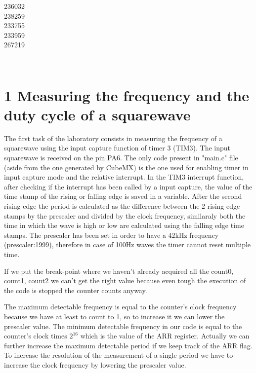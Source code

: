 \documentclass[12pt]{article}
\begin{document}
\begin{titlepage}
\begin{minipage}{0.4\textwidth}
			\begin{flushright} \large
			236032\\													%
			238259\\
            233755\\
            233959\\
            267219\\
            
		\end{flushright}
        
	\end{minipage}\\[2 cm]
	
\end{titlepage}

\newpage

\section*{1 Measuring the frequency and the duty cycle of a squarewave }

The first task of the laboratory consists in measuring the frequency of a squarewave using the input capture function of timer 3 (TIM3). The input squarewave is received on the pin PA6.
The only code present in "main.c" file (aside from the one generated by CubeMX) is the one used for enabling timer in input capture mode and the relative interrupt.
In the TIM3 interrupt function, after checking if the interrupt has been called by a input capture, the value of the time stamp of the rising or falling edge is saved in a variable. After the second rising edge the period is calculated as the difference between the 2 rising edge stamps by the prescaler and divided by the clock frequency, similaraly both the time in which the wave is high or low are calculated using the falling edge time stamps.
The prescaler has been set in order to have a 42kHz frequency (prescaler:1999), therefore in case of 100Hz waves the timer cannot reset multiple time.

If we put the break-point where we haven't already acquired all the count0, count1, count2 we can't get the right value because even tough the execution of the code is stopped the counter counts anyway.

The maximum detectable frequency is equal to the counter's clock frequency because we have at least to count to 1, so to increase it we can lower the prescaler value. The minimum detectable frequency in our code is equal to the counter's clock times $2^{16}$ which is the value of the ARR register. Actually we can further increase the maximum detectable period if we keep track of the ARR flag. \\
To increase the resolution of the measurement of a single period we have to increase the clock frequency by lowering the prescaler value.
\end{document}
